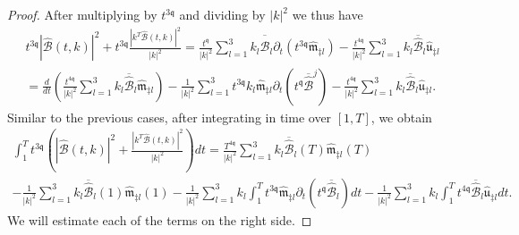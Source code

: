 \documentclass[reqno]{amsart}
\newcommand{\qq}{\mathfrak{q}}
\newcommand{\tq}{t^{\qq}}
\newcommand{\tTq}{t^{3\qq}}
\theoremstyle{definition}
\numberwithin{equation}{section}
\numberwithin{theorem}{section}
\begin{document}
\begin{proof}
After multiplying by $\tTq$ and dividing by $|k|^2$ we thus have
\begin{multline*}
 \tTq |\widehat{\mathcal{B}}(t,k)|^2 + \tTq \frac{|k^T\widehat{\mathcal{B}}(t,k)|^2}{|k|^2}
=
\frac{ \tq}{|k|^2}
\sum_{l=1}^3 
k_l\overline{\widehat{\mathcal{B}}}_l\partial_t\left( \tTq \widehat{\mathfrak{m}}_{\ddagger l} \right)
-
\frac{t^{4\qq} }{|k|^2}
\sum_{l=1}^3
k_l \overline{\widehat{\mathcal{B}}}_l \widehat{\mathfrak{u}}_{\ddagger l}
\\
=
\frac{d}{dt}\left(
\frac{ t^{4\qq}}{|k|^2}
\sum_{l=1}^3 
k_l\overline{\widehat{\mathcal{B}}}_l \widehat{\mathfrak{m}}_{\ddagger l} 
 \right)
 -
 \frac{1}{|k|^2 } 
 \sum_{l=1}^3 
  \tTq k_l\widehat{\mathfrak{m}}_{\ddagger l}\partial_t\left(\tq\overline{\widehat{\mathcal{B}}}^j\right) 
-
\frac{t^{4\qq} }{|k|^2}
\sum_{l=1}^3
k_l \overline{\widehat{\mathcal{B}}}_l \widehat{\mathfrak{u}}_{\ddagger l}.
\end{multline*}
Similar to the previous cases, after integrating in time over $[1,T]$, we obtain
\begin{multline*}
\int_1^{T} \tTq \left(  |\widehat{\mathcal{B}}(t,k)|^2 +  \frac{|k^T\widehat{\mathcal{B}}(t,k)|^2}{|k|^2}\right)  dt
=
 \frac{ T^{4\qq}}{|k|^2}
\sum_{l=1}^3 
k_l\overline{\widehat{\mathcal{B}}}_l(T) \widehat{\mathfrak{m}}_{\ddagger l} (T)
 \\
- \frac{ 1}{|k|^2}
\sum_{l=1}^3 
k_l\overline{\widehat{\mathcal{B}}}_l(1) \widehat{\mathfrak{m}}_{\ddagger l} (1)
  -
 \frac{1}{|k|^2 } 
 \sum_{l=1}^3 
   k_l \int_1^{T} \tTq \widehat{\mathfrak{m}}_{\ddagger l}\partial_t\left(\tq\overline{\widehat{\mathcal{B}}}_l\right)  dt
-
\frac{1 }{|k|^2}
\sum_{l=1}^3
k_l \int_1^{T}  t^{4\qq} \overline{\widehat{\mathcal{B}}}_l \widehat{\mathfrak{u}}_{\ddagger l} dt.
\end{multline*}
We will estimate each of the terms on the right side.


\end{proof}
\end{document}
